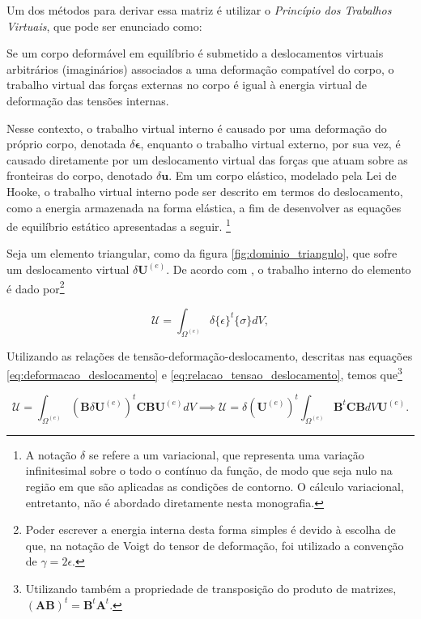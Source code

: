 Um dos métodos para derivar essa matriz é utilizar o \emph{Princípio dos Trabalhos Virtuais}, que pode ser enunciado como:

\begin{citacao}
    Se um corpo deformável em equilíbrio é submetido a deslocamentos virtuais arbitrários (imaginários) associados a uma deformação compatível do corpo, o trabalho virtual das forças externas no corpo é igual à energia virtual de deformação das tensões internas. \cite[pág. 876, tradução livre]{LOGAN}
\end{citacao}

Nesse contexto, o trabalho virtual interno é causado por uma deformação do próprio corpo, denotada $\delta \bm{\epsilon}$, enquanto o trabalho virtual externo, por sua vez, é causado diretamente por um deslocamento virtual das forças que atuam sobre as fronteiras do corpo, denotado $\delta \bm{u}$. Em um corpo elástico, modelado pela Lei de Hooke, o trabalho virtual interno pode ser descrito em termos do deslocamento, como a energia armazenada na forma elástica, a fim de desenvolver as equações de equilíbrio estático apresentadas a seguir. \footnote{A notação $\delta$ se refere a um variacional, que representa uma variação infinitesimal sobre o todo o contínuo da função, de modo que seja nulo na região em que são aplicadas as condições de contorno. O cálculo variacional, entretanto, não é abordado diretamente nesta monografia.}


Seja um elemento triangular, como da figura \ref{fig:dominio_triangulo}, que sofre um deslocamento virtual $\delta \bm{U}^{(e)}$. De acordo com , o trabalho interno do elemento é dado por\footnote{Poder escrever a energia interna desta forma simples é devido à escolha de que, na notação de Voigt do tensor de deformação, foi utilizado a convenção de $\gamma = 2 \epsilon$.}

\begin{equation}
    \mathcal{U} = \int_{\Omega^{(e)}} \delta \{\epsilon\}^t \{\sigma\} dV,
\end{equation}

Utilizando as relações de tensão-deformação-deslocamento, descritas nas equações \ref{eq:deformacao_deslocamento} e \ref{eq:relacao_tensao_deslocamento}, temos que\footnote{Utilizando também a propriedade de transposição do produto de matrizes, $(\bm{A}\bm{B})^t = \bm{B}^t \bm{A}^t$.}

\begin{equation}
    \mathcal{U} = \int_{\Omega^{(e)}} (\bm{B} \delta \bm{U}^{(e)})^t \bm{C} \bm{B} \bm{U}^{(e)} dV
    \implies \mathcal{U} = \delta (\bm{U}^{(e)})^t \int_{\Omega^{(e)}} \bm{B}^t \bm{C} \bm{B} dV \bm{U}^{(e)}.
\end{equation}

